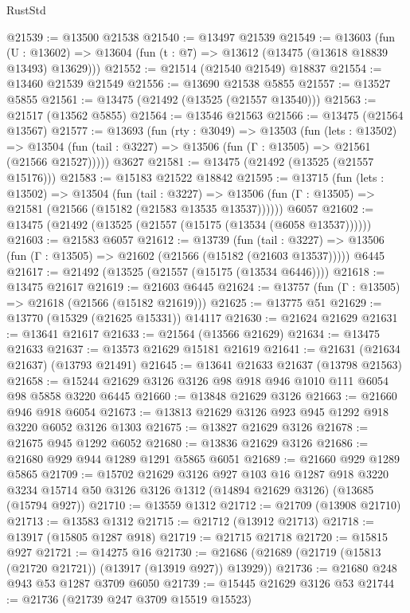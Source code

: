 \begin{lexlean}{RustStd}
\begin{coremodule}
@21539 := @13500 @21538
@21540 := @13497 @21539
@21549 := @13603
    (fun (U : @13602) => @13604 (fun (t : @7) => @13612 (@13475 (@13618 @18839 @13493) @13629)))
@21552 := @21514 (@21540 @21549) @18837
@21554 := @13460 @21539 @21549
@21556 := @13690 @21538 @5855
@21557 := @13527 @5855
@21561 := @13475 (@21492 (@13525 (@21557 @13540)))
@21563 := @21517 (@13562 @5855)
@21564 := @13546 @21563
@21566 := @13475 (@21564 @13567)
@21577 := @13693
    (fun (rty : @3049) =>
    @13503
      (fun (lets : @13502) =>
      @13504 (fun (tail : @3227) => @13506 (fun (Γ : @13505) => @21561 (@21566 @21527)))))
    @3627
@21581 := @13475 (@21492 (@13525 (@21557 @15176)))
@21583 := @15183 @21522 @18842
@21595 := @13715
    (fun (lets : @13502) =>
    @13504
      (fun (tail : @3227) =>
      @13506 (fun (Γ : @13505) => @21581 (@21566 (@15182 (@21583 @13535 @13537))))))
    @6057
@21602 := @13475 (@21492 (@13525 (@21557 (@15175 (@13534 (@6058 @13537))))))
@21603 := @21583 @6057
@21612 := @13739
    (fun (tail : @3227) => @13506 (fun (Γ : @13505) => @21602 (@21566 (@15182 (@21603 @13537)))))
    @6445
@21617 := @21492 (@13525 (@21557 (@15175 (@13534 @6446))))
@21618 := @13475 @21617
@21619 := @21603 @6445
@21624 := @13757 (fun (Γ : @13505) => @21618 (@21566 (@15182 @21619)))
@21625 := @13775 @51
@21629 := @13770 (@15329 (@21625 @15331)) @14117
@21630 := @21624 @21629
@21631 := @13641 @21617
@21633 := @21564 (@13566 @21629)
@21634 := @13475 @21633
@21637 := @13573 @21629 @15181 @21619
@21641 := @21631 (@21634 @21637) (@13793 @21491)
@21645 := @13641 @21633 @21637 (@13798 @21563)
@21658 := @15244 @21629 @3126 @3126 @98 @918 @946 @1010 @111 @6054 @98 @5858 @3220 @6445
@21660 := @13848 @21629 @3126
@21663 := @21660 @946 @918 @6054
@21673 := @13813 @21629 @3126 @923 @945 @1292 @918 @3220 @6052 @3126 @1303
@21675 := @13827 @21629 @3126
@21678 := @21675 @945 @1292 @6052
@21680 := @13836 @21629 @3126
@21686 := @21680 @929 @944 @1289 @1291 @5865 @6051
@21689 := @21660 @929 @1289 @5865
@21709 := @15702
    @21629
    @3126
    @927
    @103
    @16
    @1287
    @918
    @3220
    @3234
    @15714
    @50
    @3126
    @3126
    @1312
    (@14894 @21629 @3126)
    (@13685 (@15794 @927))
@21710 := @13559 @1312
@21712 := @21709 (@13908 @21710)
@21713 := @13583 @1312
@21715 := @21712 (@13912 @21713)
@21718 := @13917 (@15805 @1287 @918)
@21719 := @21715 @21718
@21720 := @15815 @927
@21721 := @14275 @16
@21730 := @21686 (@21689 (@21719 (@15813 (@21720 @21721)) (@13917 (@13919 @927)) @13929))
@21736 := @21680 @248 @943 @53 @1287 @3709 @6050
@21739 := @15445 @21629 @3126 @53
@21744 := @21736 (@21739 @247 @3709 @15519 @15523)

\end{coremodule}
\end{lexlean}
